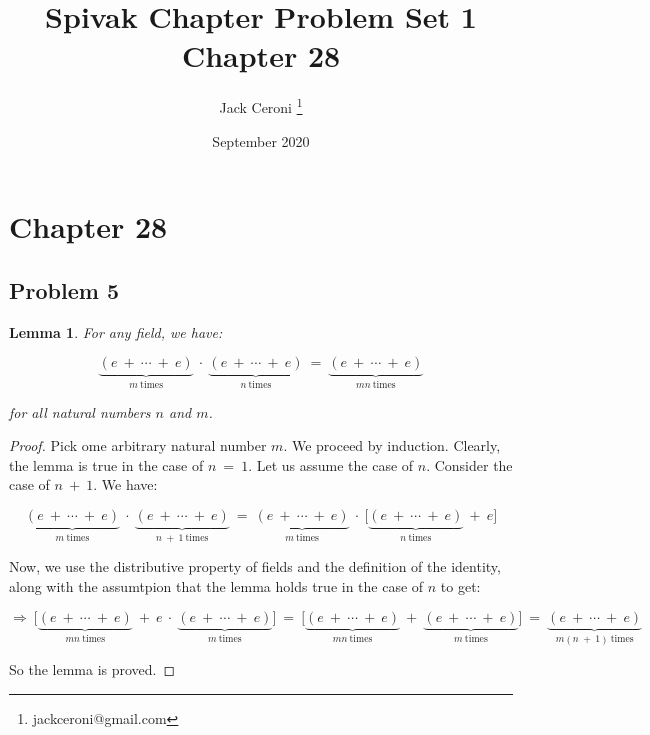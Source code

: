 \documentclass[10pt, oneside]{article}
\title{Spivak Chapter Problem Set 1 Chapter 28}
\author{Jack Ceroni \thanks{jackceroni@gmail.com}}
\date{September 2020}
\newtheorem{lem}{Lemma}
\begin{document}
\maketitle
\tableofcontents

\vspace{.25in}

\section{Chapter 28}

\subsection{Problem 5}

\begin{lem}
	For any field, we have:

	$$\underbrace{(e \ + \ \cdots \ + \ e)}_{m \ \text{times}} \ \cdot \ \underbrace{(e \ + \ 
	\cdots \ + \ e)}_{n \ \text{times}} \ = \ \underbrace{(e \ + \ \cdots \ + \ e)}_{mn \ \text{times}}$$

	for all natural numbers $n$ and $m$.
\end{lem}

\begin{proof}
	Pick ome arbitrary natural number $m$. We proceed by induction. Clearly, the lemma is true in 
	the case of $n \ = \ 1$. Let us assume the case of $n$. Consider the case of $n \ + \ 1$. We have:
	
	$$\underbrace{(e \ + \ \cdots \ + \ e)}_{m \ \text{times}} \ \cdot \ \underbrace{(e \ + \ 
	\cdots \ + \ e)}_{n \ + \ 1 \ \text{times}} \ = \ \underbrace{(e \ + \ \cdots \ + \ e)}_{m \ \text{times}} \ \cdot \ \big[ \underbrace{(e \ + \ 
\cdots \ + \ e)}_{n \ \text{times}} \ + \ e \big]$$

  Now, we use the distributive property of fields and the definition of the identity, along with the assumtpion that
  the lemma holds true in the case of $n$ to get:

$$\Rightarrow \ \big[ \underbrace{(e \ + \ 
\cdots \ + \ e)}_{mn \ \text{times}} \ + \ e \ \cdot \  \underbrace{(e \ + \ \cdots \ + \ e)}_{m \ \text{times}} \big] \ = \ 
\big[ \underbrace{(e \ + \ 
\cdots \ + \ e)}_{mn \ \text{times}} \ + \ \underbrace{(e \ + \ \cdots \ + \ e)}_{m \ \text{times}} \big] \ = \ 
\underbrace{(e \ + \ 
\cdots \ + \ e)}_{m(n \ + \ 1) \ \text{times}}$$ 

So the lemma is proved.

\end{proof}
\end{document}
